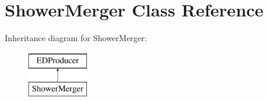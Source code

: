 \hypertarget{classShowerMerger}{}\section{Shower\+Merger Class Reference}
\label{classShowerMerger}
Inheritance diagram for Shower\+Merger\+:\begin{figure}[H]
\begin{center}
\leavevmode
\includegraphics[height=2.000000cm]{classShowerMerger}
\end{center}
\end{figure}
